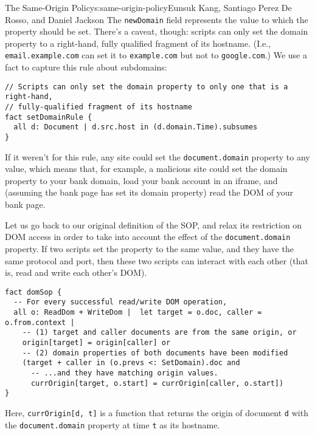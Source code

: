 \begin{aosachapter}{The Same-Origin Policy}{s:same-origin-policy}{Eunsuk Kang, Santiago Perez De Rosso, and Daniel Jackson}
The \texttt{newDomain} field represents the value to which the property
should be set. There's a caveat, though: scripts can only set the domain
property to a right-hand, fully qualified fragment of its hostname.
(I.e., \texttt{email.example.com} can set it to \texttt{example.com} but
not to \texttt{google.com}.) We use a fact to capture this rule about
subdomains:

\begin{verbatim}
// Scripts can only set the domain property to only one that is a right-hand,
// fully-qualified fragment of its hostname
fact setDomainRule {
  all d: Document | d.src.host in (d.domain.Time).subsumes
}
\end{verbatim}

If it weren't for this rule, any site could set the
\texttt{document.domain} property to any value, which means that, for
example, a malicious site could set the domain property to your bank
domain, load your bank account in an iframe, and (assuming the bank page
has set its domain property) read the DOM of your bank page.

Let us go back to our original definition of the SOP, and relax its
restriction on DOM access in order to take into account the effect of
the \texttt{document.domain} property. If two scripts set the property
to the same value, and they have the same protocol and port, then these
two scripts can interact with each other (that is, read and write each
other's DOM).

\begin{verbatim}
fact domSop {
  -- For every successful read/write DOM operation,
  all o: ReadDom + WriteDom |  let target = o.doc, caller = o.from.context |
    -- (1) target and caller documents are from the same origin, or
    origin[target] = origin[caller] or
    -- (2) domain properties of both documents have been modified
    (target + caller in (o.prevs <: SetDomain).doc and
      -- ...and they have matching origin values.
      currOrigin[target, o.start] = currOrigin[caller, o.start])
}
\end{verbatim}

Here, \texttt{currOrigin{[}d, t{]}} is a function that returns the
origin of document \texttt{d} with the \texttt{document.domain} property
at time \texttt{t} as its hostname.


\end{aosachapter}
